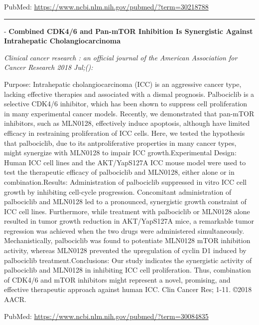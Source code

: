 \documentclass[]{article}
\begin{document}
PubMed: \url{https://www.ncbi.nlm.nih.gov/pubmed/?term=30218788}

{}

{}

\begin{center}\rule{0.5\linewidth}{\linethickness}\end{center}

 - \textbf{Combined CDK4/6 and Pan-mTOR Inhibition Is Synergistic
Against Intrahepatic Cholangiocarcinoma}

\emph{Clinical cancer research : an official journal of the American
Association for Cancer Research 2018 Jul;():}

Purpose: Intrahepatic cholangiocarcinoma (ICC) is an aggressive cancer
type, lacking effective therapies and associated with a dismal
prognosis. Palbociclib is a selective CDK4/6 inhibitor, which has been
shown to suppress cell proliferation in many experimental cancer models.
Recently, we demonstrated that pan-mTOR inhibitors, such as MLN0128,
effectively induce apoptosis, although have limited efficacy in
restraining proliferation of ICC cells. Here, we tested the hypothesis
that palbociclib, due to its antproliferative properties in many cancer
types, might synergize with MLN0128 to impair ICC growth.Experimental
Design: Human ICC cell lines and the AKT/YapS127A ICC mouse model were
used to test the therapeutic efficacy of palbociclib and MLN0128, either
alone or in combination.Results: Administration of palbociclib
suppressed in vitro ICC cell growth by inhibiting cell-cycle
progression. Concomitant administration of palbociclib and MLN0128 led
to a pronounced, synergistic growth constraint of ICC cell lines.
Furthermore, while treatment with palbociclib or MLN0128 alone resulted
in tumor growth reduction in AKT/YapS127A mice, a remarkable tumor
regression was achieved when the two drugs were administered
simultaneously. Mechanistically, palbociclib was found to potentiate
MLN0128 mTOR inhibition activity, whereas MLN0128 prevented the
upregulation of cyclin D1 induced by palbociclib treatment.Conclusions:
Our study indicates the synergistic activity of palbociclib and MLN0128
in inhibiting ICC cell proliferation. Thus, combination of CDK4/6 and
mTOR inhibitors might represent a novel, promising, and effective
therapeutic approach against human ICC. Clin Cancer Res; 1-11. ©2018
AACR.

PubMed: \url{https://www.ncbi.nlm.nih.gov/pubmed/?term=30084835}

{}

{}
\end{document}
